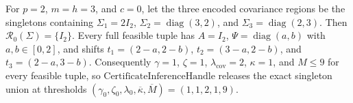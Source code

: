 For \(p=2\), \(m=h=3\), and \(c=0\), let the three encoded covariance regions be the singletons containing \(\Sigma_1=2I_2\), \(\Sigma_2=\operatorname{diag}(3,2)\), and \(\Sigma_3=\operatorname{diag}(2,3)\). Then \(\mathcal R_0(\Sigma)=\{I_2\}\). Every full feasible tuple has \(A=I_2\), \(\Psi=\operatorname{diag}(a,b)\) with \(a,b\in[0,2]\), and shifts \(t_1=(2-a,2-b)\), \(t_2=(3-a,2-b)\), and \(t_3=(2-a,3-b)\). Consequently \(\gamma=1\), \(\zeta=1\), \(\lambda_{\mathrm{cov}}=2\), \(\kappa=1\), and \(M\leq9\) for every feasible tuple, so \(\text{CertificateInferenceHandle}\) releases the exact singleton union at thresholds \((\gamma_0,\zeta_0,\lambda_0,\overline\kappa,\overline M)=(1,1,2,1,9)\).